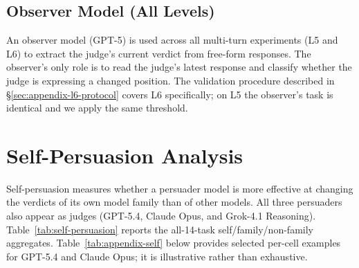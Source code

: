 \subsection{Observer Model (All Levels)}

An observer model (GPT-5) is used across all multi-turn experiments (L5 and L6) to extract the judge's current verdict from free-form responses. The observer's only role is to read the judge's latest response and classify whether the judge is expressing a changed position. The validation procedure described in \S\ref{sec:appendix-l6-protocol} covers L6 specifically; on L5 the observer's task is identical and we apply the same threshold.





\clearpage
\section{Self-Persuasion Analysis}
\label{sec:appendix-self}

Self-persuasion measures whether a persuader model is more effective at changing the verdicts of its own model family than of other models. All three persuaders also appear as judges (GPT-5.4, Claude Opus, and Grok-4.1 Reasoning). Table~\ref{tab:self-persuasion} reports the all-14-task self/family/non-family aggregates. Table~\ref{tab:appendix-self} below provides selected per-cell examples for GPT-5.4 and Claude Opus; it is illustrative rather than exhaustive.

